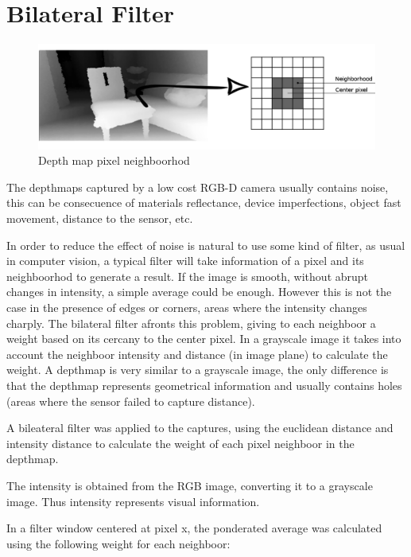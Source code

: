 \section{Bilateral Filter}

\begin{figure}
\begin{center}
\includegraphics[scale=0.25]{images/vecindarioDepth}
\end{center}
\caption{Depth map pixel neighboorhod}
\label{fig:neighboor}
\end{figure}

The depthmaps captured by a low cost RGB-D camera usually contains noise, this can be 
consecuence of materials reflectance, device imperfections, object fast movement, distance to the 
sensor, etc. 

In order to reduce the effect of noise is natural to use some kind of filter, as usual in computer 
vision, a typical filter will take information of a pixel and its neighboorhod to generate a result. 
If the image is smooth, without abrupt changes in intensity, a simple average could be enough. However this 
is not the case in the presence of edges or corners, areas where the intensity changes charply. 
The bilateral filter afronts this problem, giving to each neighboor a weight based on its cercany  
to the center pixel. In a grayscale image it takes into account 
the neighboor intensity and distance (in image plane) to calculate the weight. A depthmap is very similar to a grayscale 
image, the only difference is that the depthmap represents geometrical information and usually contains holes 
(areas where the sensor failed to capture distance). 


A bileateral filter was applied to the captures, using the euclidean distance and intensity distance to calculate 
the weight of each pixel neighboor in the depthmap.

The intensity is obtained from the RGB image, converting it to a grayscale image. Thus intensity represents visual 
information.

In a filter window centered at pixel x, the ponderated average was calculated using the following weight for each neighboor:

